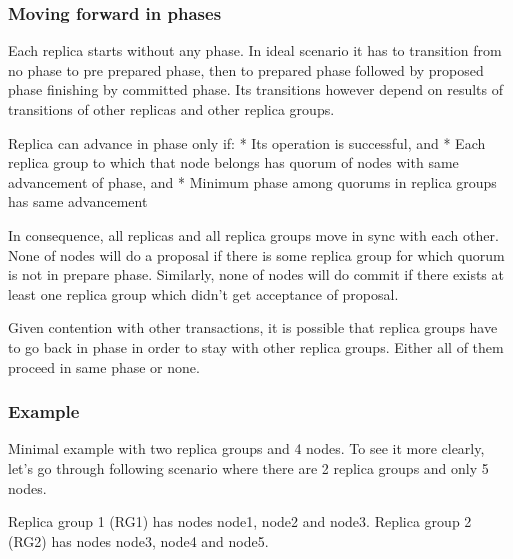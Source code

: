 \subsubsection{Moving forward in phases}
Each replica starts without any phase. In ideal scenario it has to transition from no phase to pre prepared phase, then to prepared phase followed by proposed phase finishing by committed phase. Its transitions however depend on results of transitions of other replicas and other replica groups.


Replica can advance in phase only if:
* Its operation is successful, and
* Each replica group to which that node belongs has quorum of nodes with same advancement of phase, and
* Minimum phase among quorums in replica groups has same advancement


In consequence, all replicas and all replica groups move in sync with each other. None of nodes will do a proposal if there is some replica group for which quorum is not in prepare phase. Similarly, none of nodes will do commit if there exists at least one replica group which didn’t get acceptance of proposal.


Given contention with other transactions, it is possible that replica groups have to go back in phase in order to stay with other replica groups. Either all of them proceed in same phase or none.


\subsubsection{Example}
Minimal example with two replica groups and 4 nodes.
To see it more clearly, let’s go through following scenario where there are 2 replica groups and only 5 nodes. 


Replica group 1 (RG1) has nodes node1, node2 and node3. 
Replica group 2 (RG2) has nodes node3, node4 and node5.


